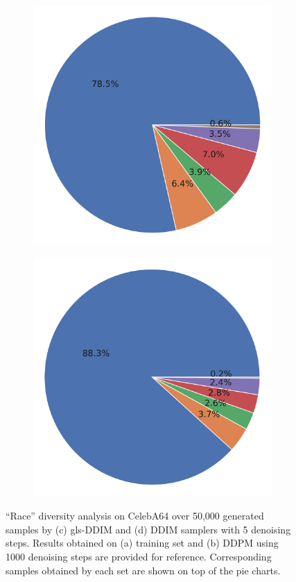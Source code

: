 \documentclass{article}
\begin{document}
\begin{figure}
\begin{subfigure}{0.235\textwidth}
    \includegraphics[width=0.8\linewidth]{figs/plots/gslddim-5-500_race.png}
  \end{subfigure}\hfill
  \begin{subfigure}{0.235\textwidth}
  \centering
    \includegraphics[width=0.8\linewidth]{figs/plots/ddim-5-800_race.png}
  \end{subfigure}\hfill
  \caption{``Race'' diversity analysis on CelebA64 over 50,000 generated samples by (c) gls-DDIM and (d) DDIM samplers with 5 denoising steps. Results obtained on (a) training set and (b) DDPM using 1000 denoising steps are provided for reference. Corresponding samples obtained by each set are shown on top of the pie charts.}
  \label{fig:diversity_analysis}
\end{figure}
\end{document}
